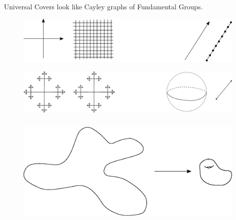 \documentclass{beamer}
\begin{document}



\begin{frame}\frametitle{}

Universal Covers look like Cayley graphs of Fundamental Groups.


\begin{figure}
\centering
\includegraphics[scale=0.4]{Torus.eps}
\end{figure}

\begin{figure}
\centering
\includegraphics[scale=0.4]{Unicayley.eps}
\end{figure}

\end{frame}




\begin{frame}\frametitle{}

\begin{figure}
\centering
\includegraphics[scale=0.6]{Nerving1.eps}
\end{figure}


\end{frame}
\end{document}
